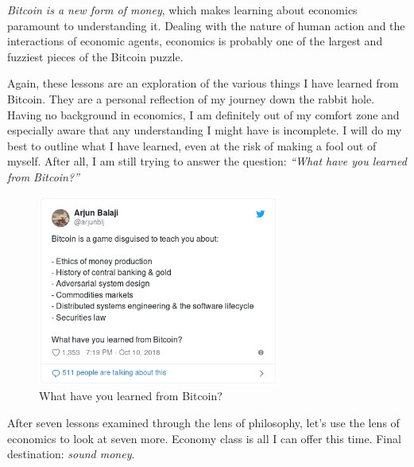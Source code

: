 \textit{Bitcoin is a new form of money}, which makes learning about
economics paramount to understanding it. Dealing with the nature of human action
and the interactions of economic agents, economics is probably one of the
largest and fuzziest pieces of the Bitcoin puzzle.

Again, these lessons are an exploration of the various things I have learned
from Bitcoin. They are a personal reflection of my journey down the rabbit hole.
Having no background in economics, I am definitely out of my comfort zone and
especially aware that any understanding I might have is incomplete. I will do my
best to outline what I have learned, even at the risk of making a fool out of
myself. After all, I am still trying to answer the question:
\textit{\enquote{What have you learned from Bitcoin?}}

\begin{figure}
  \centering
  \includegraphics[width=8cm]{assets/images/the-tweet.png}
  \caption{What have you learned from Bitcoin?}
  \label{fig:the-tweet}
\end{figure}

After seven lessons examined through the lens of philosophy, let’s use the lens
of economics to look at seven more. Economy class is all I can offer this time.
Final destination: \textit{sound money}.

